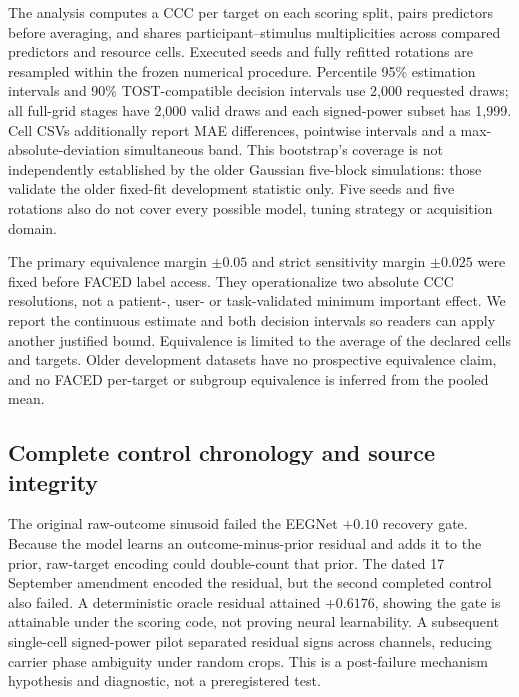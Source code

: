 The analysis computes a CCC per target on each scoring split, pairs predictors
before averaging, and shares participant--stimulus multiplicities across
compared predictors and resource cells. Executed seeds and fully refitted
rotations are resampled within the frozen numerical procedure. Percentile 95\%
estimation intervals and 90\% TOST-compatible decision intervals use 2,000
requested draws; all full-grid stages have 2,000 valid draws and each
signed-power subset has 1,999. Cell CSVs additionally report MAE differences,
pointwise intervals and a max-absolute-deviation simultaneous band. This
bootstrap's coverage is not independently established by the older Gaussian
five-block simulations: those validate the older fixed-fit development
statistic only. Five seeds and five rotations also do not cover every possible
model, tuning strategy or acquisition domain.

The primary equivalence margin $\pm0.05$ and strict sensitivity margin
$\pm0.025$ were fixed before FACED label access. They operationalize two
absolute CCC resolutions, not a patient-, user- or task-validated minimum
important effect. We report the continuous estimate and both decision
intervals so readers can apply another justified bound. Equivalence is limited
to the average of the declared cells and targets. Older development datasets
have no prospective equivalence claim, and no FACED per-target or subgroup
equivalence is inferred from the pooled mean.



\subsection{Complete control chronology and source integrity}
The original raw-outcome sinusoid failed the EEGNet $+0.10$ recovery gate.
Because the model learns an outcome-minus-prior residual and adds it to the
prior, raw-target encoding could double-count that prior. The dated
17 September amendment encoded the residual, but the second completed control
also failed. A deterministic oracle residual attained $+0.6176$, showing the
gate is attainable under the scoring code, not proving neural learnability.
A subsequent single-cell signed-power pilot separated residual signs across
channels, reducing carrier phase ambiguity under random crops. This is a
post-failure mechanism hypothesis and diagnostic, not a preregistered test.

